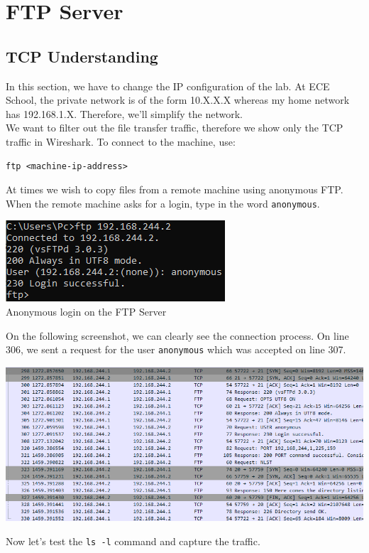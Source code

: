 \documentclass[12pt]{extarticle}
\begin{document}
\section{FTP Server}
\subsection{TCP Understanding}
In this section, we have to change the IP configuration of the lab. At ECE School, the private network is of the form 10.X.X.X whereas my home network has 192.168.1.X. Therefore, we'll simplify the network.\\

We want to filter out the file transfer traffic, therefore we show only the TCP traffic in Wireshark. To connect to the machine, use:
\begin{verbatim}
ftp <machine-ip-address>
\end{verbatim}
At times we wish to copy files from a remote machine using anonymous FTP. When the remote machine asks for a login, type in the word \texttt{anonymous}.
\begin{center}
\includegraphics[scale=0.8]{resources/5-1-1.png}\\
Anonymous login on the FTP Server
\end{center}
On the following screenshot, we can clearly see the connection process. On line 306, we sent a request for the user \texttt{anonymous} which was accepted on line 307.
\begin{center}
\includegraphics[scale=0.6]{resources/5-1-2.png}
\end{center}
Now let's test the \texttt{ls -l} command and capture the traffic.
\end{document}
